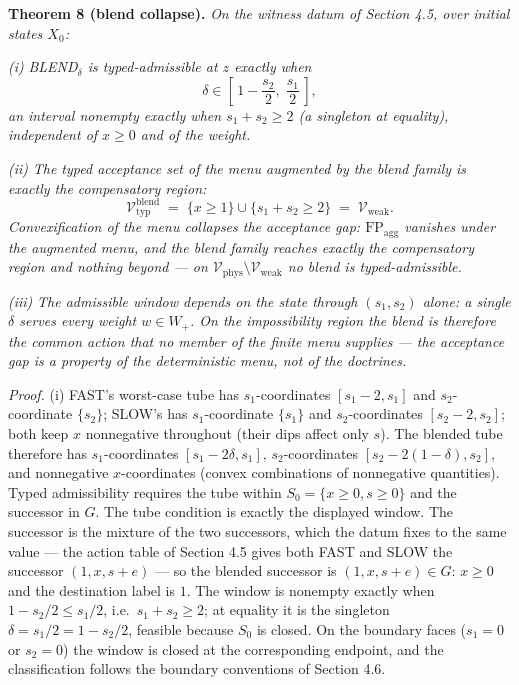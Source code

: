 \documentclass[11pt]{article}
\begin{document}
\textbf{Theorem 8 (blend collapse).} \emph{On the witness datum of
Section 4.5, over initial states \(X_0\):}

\emph{(i)} \emph{BLEND\(_\delta\) is typed-admissible at \(z\) exactly
when}
\[\delta \in \left[\,1 - \frac{s_2}{2},\; \frac{s_1}{2}\,\right],\]
\emph{an interval nonempty exactly when \(s_1 + s_2 \ge 2\) (a singleton
at equality), independent of \(x \ge 0\) and of the weight.}

\emph{(ii)} \emph{The typed acceptance set of the menu augmented by the
blend family is exactly the compensatory region:}
\[\mathcal{V}_{\mathrm{typ}}^{\mathrm{blend}} \;=\; \{ x \ge 1 \} \cup \{ s_1 + s_2 \ge 2 \} \;=\; \mathcal{V}_{\mathrm{weak}}.\]
\emph{Convexification of the menu collapses the acceptance gap:
\(\mathrm{FP}_{\mathrm{agg}}\) vanishes under the augmented menu, and
the blend family reaches exactly the compensatory region and nothing
beyond --- on
\(\mathcal{V}_{\mathrm{phys}} \setminus \mathcal{V}_{\mathrm{weak}}\) no
blend is typed-admissible.}

\emph{(iii)} \emph{The admissible window depends on the state through
\((s_1, s_2)\) alone: a single \(\delta\) serves every weight
\(w \in W_+\). On the impossibility region the blend is therefore the
common action that no member of the finite menu supplies --- the
acceptance gap is a property of the deterministic menu, not of the
doctrines.}

\emph{Proof.} (i) FAST's worst-case tube has \(s_1\)-coordinates
\([s_1 - 2, s_1]\) and \(s_2\)-coordinate \(\{s_2\}\); SLOW's has
\(s_1\)-coordinate \(\{s_1\}\) and \(s_2\)-coordinates
\([s_2 - 2, s_2]\); both keep \(x\) nonnegative throughout (their dips
affect only \(s\)). The blended tube therefore has \(s_1\)-coordinates
\([s_1 - 2\delta, s_1]\), \(s_2\)-coordinates
\([s_2 - 2(1-\delta), s_2]\), and nonnegative \(x\)-coordinates (convex
combinations of nonnegative quantities). Typed admissibility requires
the tube within \(S_0 = \{x \ge 0, s \ge 0\}\) and the successor in
\(G\). The tube condition is exactly the displayed window. The successor
is the mixture of the two successors, which the datum fixes to the same
value --- the action table of Section 4.5 gives both FAST and SLOW the
successor \((1, x, s + e)\) --- so the blended successor is
\((1, x, s + e) \in G\): \(x \ge 0\) and the destination label is \(1\).
The window is nonempty exactly when \(1 - s_2/2 \le s_1/2\),
i.e.~\(s_1 + s_2 \ge 2\); at equality it is the singleton
\(\delta = s_1/2 = 1 - s_2/2\), feasible because \(S_0\) is closed. On
the boundary faces (\(s_1 = 0\) or \(s_2 = 0\)) the window is closed at
the corresponding endpoint, and the classification follows the boundary
conventions of Section 4.6.
\end{document}
